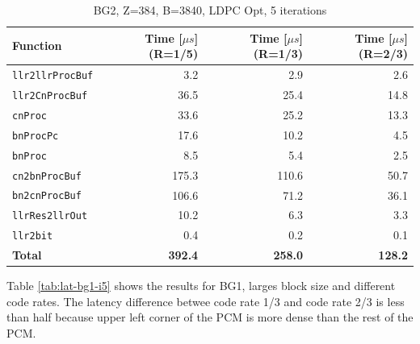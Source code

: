 \documentclass{article}
\begin{document}
\begin{table}[ht]
  \centering
  \begin{tabular}{lrrr}
    \toprule
    \textbf{Function} & \textbf{Time [$\mu s$] (R=1/5)} & \textbf{Time [$\mu s$] (R=1/3)} & \textbf{Time [$\mu s$] (R=2/3)}\\
    \midrule
    \texttt{llr2llrProcBuf} & 3.2   & 2.9   & 2.6   \\
    \texttt{llr2CnProcBuf}  & 36.5  & 25.4  & 14.8  \\
    \texttt{cnProc}         & 33.6  & 25.2  & 13.3  \\
    \texttt{bnProcPc}       & 17.6  & 10.2  & 4.5   \\
    \texttt{bnProc}         & 8.5   & 5.4   & 2.5   \\
    \texttt{cn2bnProcBuf}   & 175.3 & 110.6 & 50.7  \\
    \texttt{bn2cnProcBuf}   & 106.6 & 71.2  & 36.1  \\
    \texttt{llrRes2llrOut}  & 10.2  & 6.3   & 3.3   \\
    \texttt{llr2bit}        & 0.4   & 0.2   & 0.1   \\
    \midrule
    \textbf{Total}          & \textbf{392.4} & \textbf{258.0} & \textbf{128.2} \\
    \bottomrule
  \end{tabular}
  \caption{BG2, Z=384, B=3840, LDPC Opt, 5 iterations}
  \label{tab:lat-bg2-i5}
\end{table}

Table \ref{tab:lat-bg1-i5} shows the results for BG1, larges block size and different code rates. The latency difference betwee code rate 1/3 and code rate 2/3 is less than half because upper left corner of the PCM is more dense than the rest of the PCM.
\end{document}
